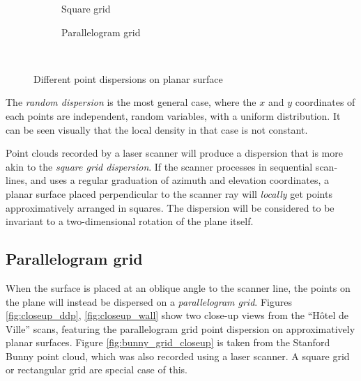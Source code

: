 \begin{figure}[H]
\begin{subfigure}{.3\textwidth}
{	\caption{Square grid}
}
\end{subfigure}%
\hfill%
\begin{subfigure}{.3\textwidth}
{
	\setlength{\fboxsep}{0pt}%
	\setlength{\fboxrule}{0.5pt}%
	\caption{Parallelogram grid}
}%
\end{subfigure}\\
\caption{Different point dispersions on planar surface}
\label{fig:point_dispersion}
\end{figure}

The \emph{random dispersion} is the most general case, where the $x$ and $y$ coordinates of each points are independent, random variables, with a uniform distribution. It can be seen visually that the local density in that case is not constant.

Point clouds recorded by a laser scanner will produce a dispersion that is more akin to the \emph{square grid dispersion}. If the scanner processes in sequential scan-lines, and uses a regular graduation of azimuth and elevation coordinates, a planar surface placed perpendicular to the scanner ray will \emph{locally} get points approximatively arranged in squares. The dispersion will be considered to be invariant to a two-dimensional rotation of the plane itself.

\subsection{Parallelogram grid}
When the surface is placed at an oblique angle to the scanner line, the points on the plane will instead be dispersed on a \emph{parallelogram grid}. Figures \ref{fig:closeup_ddp}, \ref{fig:closeup_wall} show two close-up views from the ``Hôtel de Ville'' scans, featuring the parallelogram grid point dispersion on approximatively planar surfaces. Figure \ref{fig:bunny_grid_closeup} is taken from the Stanford Bunny point cloud, which was also recorded using a laser scanner. A square grid or rectangular grid are special case of this.

